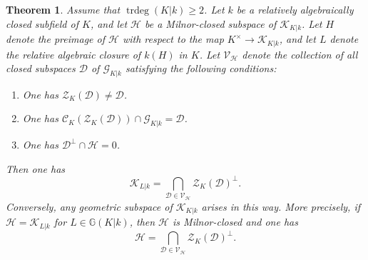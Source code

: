 \documentclass[12pt]{amsart}
\newcommand{\Gbb}{\mathbb{G}}
\newcommand{\trdeg}{\operatorname{trdeg}}
\newcommand{\Vscr}{\mathscr{V}}
\newcommand{\Zcal}{\mathcal{Z}}
\newcommand{\Ccal}{\mathcal{C}}
\newcommand{\Gcal}{\mathcal{G}}
\newcommand{\Dcal}{\mathcal{D}}
\newcommand{\Hcal}{\mathcal{H}}
\newcommand{\Kcal}{\mathcal{K}}
\newtheorem{theorem}{Theorem}[section]
\theoremstyle{definition}
\begin{document}
\begin{theorem}\label{theorem:recover_Kcal_geom_lattice}
  Assume that $\trdeg(K|k) \geq 2$.
  Let $k$ be a relatively algebraically closed subfield of $K$, and let $\Hcal$ be a Milnor-closed subspace of $\Kcal_{K|k}$.
  Let $H$ denote the preimage of $\Hcal$ with respect to the map $K^{\times} \to \Kcal_{K|k}$, and let $L$ denote the relative algebraic closure of $k(H)$ in $K$.
  Let $\Vscr_{\Hcal}$ denote the collection of all closed subspaces $\Dcal$ of $\Gcal_{K|k}$ satisfying the following conditions:
  \begin{enumerate}
    \item One has $\Zcal_{K}(\Dcal) \neq \Dcal$.
    \item One has $\Ccal_{K}(\Zcal_{K}(\Dcal)) \cap \Gcal_{K|k} = \Dcal$.
    \item One has $\Dcal^{\perp} \cap \Hcal = 0$.
  \end{enumerate}
  Then one has
  \[ \Kcal_{L|k} = \bigcap_{\Dcal \in \Vscr_{\Hcal}} \Zcal_{K}(\Dcal)^{\perp}. \]
  Conversely, any geometric subspace of $\Kcal_{K|k}$ arises in this way.
  More precisely, if $\Hcal = \Kcal_{L|k}$ for $L \in \Gbb(K|k)$, then $\Hcal$ is Milnor-closed and one has
  \[ \Hcal = \bigcap_{\Dcal \in \Vscr_{\Hcal}} \Zcal_{K}(\Dcal)^{\perp}. \]
\end{theorem}
\end{document}
